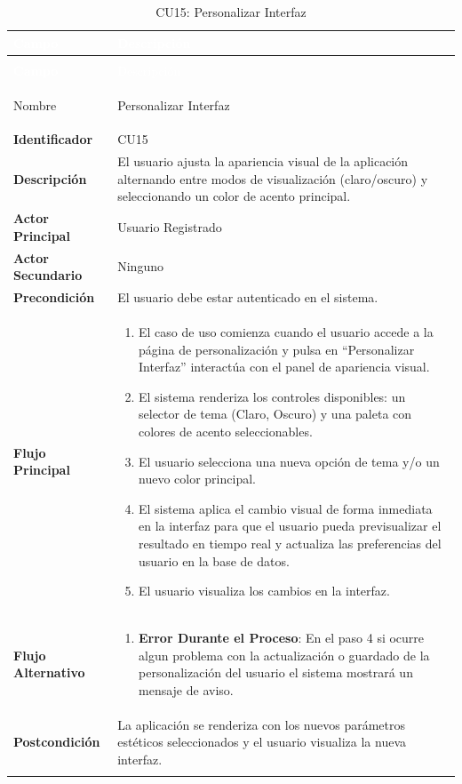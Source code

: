 \begingroup
\small 
\renewcommand{\arraystretch}{1.4}
\begin{xltabular}{\textwidth}{|>{\bfseries}p{3.5cm}|X|}
    \textcolor{white}{Campo} & \textcolor{white}{Descripción} \\ \hline
    \endfirsthead

     \\
    \hline
    \textcolor{white}{Campo} & \textcolor{white}{Descripción} \\ \hline
    \endhead

    Nombre & Personalizar Interfaz \\ \hline
    Identificador & CU15 \\ \hline
    Descripción & El usuario ajusta la apariencia visual de la aplicación alternando entre modos de visualización (claro/oscuro) y seleccionando un color de acento principal. \\ \hline
    Actor Principal & Usuario Registrado \\ \hline
    Actor Secundario & Ninguno \\ \hline
    Precondición & El usuario debe estar autenticado en el sistema. \\ \hline
    Flujo Principal & 
    \begin{enumerate}[leftmargin=0.5cm, topsep=0pt, partopsep=0pt, parsep=0pt, itemsep=4pt]
        \item El caso de uso comienza cuando el usuario accede a la página de personalización y pulsa en ``Personalizar Interfaz'' interactúa con el panel de apariencia visual.
        \item El sistema renderiza los controles disponibles: un selector de tema (Claro, Oscuro) y una paleta con colores de acento seleccionables.
        \item El usuario selecciona una nueva opción de tema y/o un nuevo color principal.
        \item El sistema aplica el cambio visual de forma inmediata en la interfaz para que el usuario pueda previsualizar el resultado en tiempo real y actualiza las preferencias del usuario en la base de datos.
        \item El usuario visualiza los cambios en la interfaz.
    \end{enumerate} 
    \\ \hline
    Flujo Alternativo & 
    \begin{enumerate}[leftmargin=0.5cm, topsep=0pt, partopsep=0pt, parsep=0pt, itemsep=4pt]
        \item \textbf{Error Durante el Proceso}: En el paso 4 si ocurre algun problema con la actualización o guardado de la personalización del usuario el sistema mostrará un mensaje de aviso.
    \end{enumerate}
    \\ \hline
    Postcondición & La aplicación se renderiza con los nuevos parámetros estéticos seleccionados y el usuario visualiza la nueva interfaz. \\ \hline

    \caption{CU15: Personalizar Interfaz}
    \label{tab:esp_cu15} \\
\end{xltabular}
\endgroup